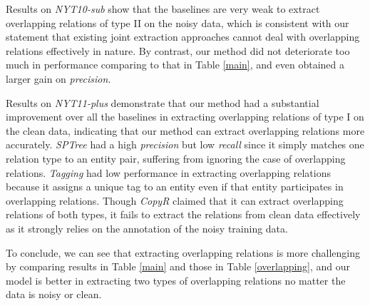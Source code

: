 \documentclass[letterpaper]{article} \usepackage{aaai19}  \usepackage{times}  \usepackage{helvet}  \usepackage{courier}  \usepackage{url}  \usepackage{graphicx}  \frenchspacing  \setlength{\pdfpagewidth}{8.5in}  \setlength{\pdfpageheight}{11in}  \usepackage{amsfonts}
\theoremstyle{definition}
\begin{document}
Results on \textit{NYT10-sub} show that the baselines are very weak to extract overlapping relations of type II on the noisy data, which is consistent with our statement that existing joint extraction approaches cannot deal with overlapping relations effectively in nature. By contrast, our method did not deteriorate too much in performance comparing to that in Table \ref{main}, and even obtained a larger gain on \textit{precision}. 



Results on \textit{NYT11-plus} demonstrate that our method had a substantial  improvement over all the baselines in extracting overlapping relations of type I on the clean data, indicating that our method can extract overlapping relations more accurately. \textit{SPTree} had a high \textit{precision} but low \textit{recall} since it simply matches one relation type to an entity pair, suffering from ignoring the case of overlapping relations. \textit{Tagging} had low performance in extracting overlapping relations because it assigns a unique tag to an entity even if that entity participates in overlapping relations. Though \textit{CopyR} claimed that it can extract overlapping relations of both types, it fails to extract the relations from clean data effectively as it strongly relies on the annotation of the noisy training data.

To conclude, we can see that extracting overlapping relations is more challenging by comparing results in Table \ref{main} and those in Table \ref{overlapping}, and our model is better in extracting two types of overlapping relations no matter the data is noisy or clean. 
\end{document}

